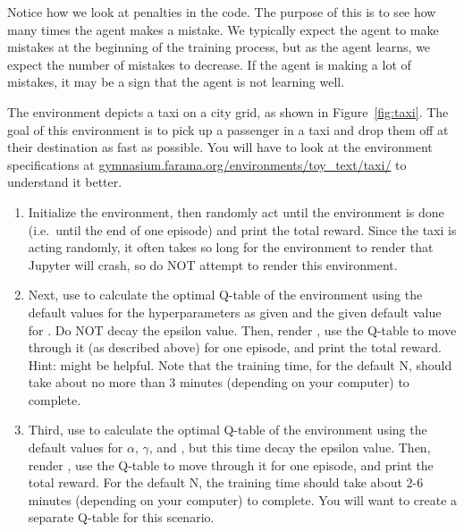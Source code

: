 Notice how we look at penalties in the code.
The purpose of this is to see how many times the agent makes a mistake.
We typically expect the agent to make mistakes at the beginning of the training process, but as the agent learns, we expect the number of mistakes to decrease.
If the agent is making a lot of mistakes, it may be a sign that the agent is not learning well.

\begin{problem}
\label{prob:qlearn}
The environment  depicts a taxi on a city grid, as shown in Figure\ \ref{fig:taxi}.
The goal of this environment is to pick up a passenger in a taxi and drop them off at their destination as fast as possible.
You will have to look at the environment specifications at \url{gymnasium.farama.org/environments/toy_text/taxi/} to understand it better.

\begin{enumerate}
\item Initialize the environment, then randomly act until the environment is done (i.e.\ until the end of one episode) and print the total reward.
Since the taxi is acting randomly, it often takes so long for the environment to render that Jupyter will crash, so do NOT attempt to render this environment.

\item Next, use  to calculate the optimal Q-table of the environment using the default values for the hyperparameters as given and the given default value for .
Do NOT decay the epsilon value.
Then, render , use the Q-table to move through it (as described above) for one episode, and print the total reward.
Hint:  might be helpful.
Note that the training time, for the default N, should take about no more than 3 minutes (depending on your computer) to complete.

\item Third, use  to calculate the optimal Q-table of the environment using the default values for $\alpha$, $\gamma$, and , but this time decay the epsilon value.
Then, render , use the Q-table to move through it for one episode, and print the total reward.
For the default N, the training time should take about 2-6 minutes (depending on your computer) to complete.
You will want to create a separate Q-table for this scenario.


\end{enumerate}
\end{problem}
